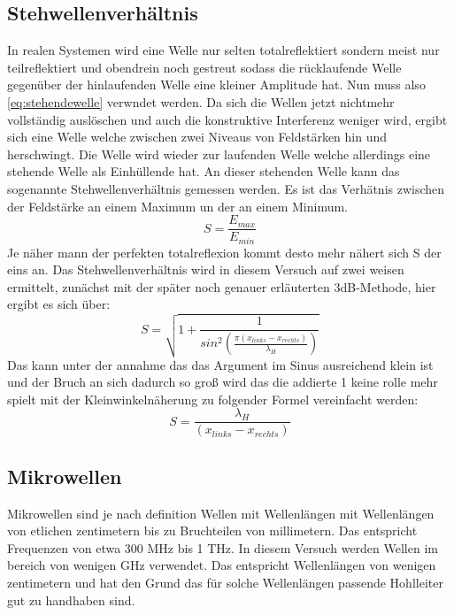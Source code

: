 \subsection{Stehwellenverhältnis}
\label{sec:thstehwelle}
In realen Systemen wird eine Welle nur selten totalreflektiert sondern meist nur teilreflektiert
und obendrein noch gestreut sodass die rücklaufende Welle gegenüber der hinlaufenden Welle eine
kleiner Amplitude hat. Nun muss also \autoref{eq:stehendewelle} verwndet werden. Da sich die Wellen 
jetzt nichtmehr vollständig auslöschen und auch die konstruktive Interferenz weniger wird, ergibt 
sich eine Welle welche zwischen zwei Niveaus von Feldstärken hin und herschwingt. Die Welle 
wird wieder zur laufenden Welle welche allerdings eine stehende Welle als Einhüllende hat.
An dieser stehenden Welle kann das sogenannte Stehwellenverhältnis gemessen werden. Es ist das 
Verhätnis zwischen der Feldstärke an einem Maximum un der an einem Minimum.
\begin{equation}
    \label{eq:stehwellenverhaeltnis}
    S=\frac{E_{max}}{E_{min}}
\end{equation}
Je näher mann der perfekten totalreflexion kommt desto mehr nähert sich S der eins an.
Das Stehwellenverhältnis wird in diesem Versuch auf zwei weisen ermittelt, zunächst mit der
später noch genauer erläuterten 3dB-Methode, hier ergibt es sich über:
\begin{equation}
    \label{eq:dreidB}
    S=\sqrt{1+\frac{1}{sin^2(\frac{\pi (x_{links}-x_{rechts})}{\lambda_H})}}
\end{equation}
Das kann unter der annahme das das Argument im Sinus ausreichend klein ist und der Bruch an sich 
dadurch so groß wird das die addierte 1 keine rolle mehr spielt mit der Kleinwinkelnäherung zu folgender
Formel vereinfacht werden:
\begin{equation}
    \label{eq:3dBleicht}
    S=\frac{\lambda_H}{(x_{links}-x_{rechts})}
\end{equation}

\subsection{Mikrowellen}
\label{sec:thallgemein}
Mikrowellen sind je nach definition Wellen mit Wellenlängen mit Wellenlängen von etlichen zentimetern bis
zu Bruchteilen von millimetern. Das entspricht Frequenzen von etwa 300 MHz bis 1 THz. In diesem Versuch werden
Wellen im bereich von wenigen GHz verwendet. Das entspricht Wellenlängen von wenigen zentimetern und hat den
Grund das für solche Wellenlängen passende Hohlleiter gut zu handhaben sind.

